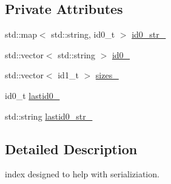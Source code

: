 \subsection*{Private Attributes}
\begin{DoxyCompactItemize}
\item 
std\-::map$<$ std\-::string, id0\-\_\-t $>$ \hyperlink{classfile__index_a6534d221b04ca8a8cdb12b05b87dd97b}{id0\-\_\-str\-\_\-}
\item 
std\-::vector$<$ std\-::string $>$ \hyperlink{classfile__index_a4be855352027b35e822cecf1f92a60a0}{id0\-\_\-}
\item 
std\-::vector$<$ id1\-\_\-t $>$ \hyperlink{classfile__index_a9be03afd832c7b341c13736733495c79}{sizes\-\_\-}
\item 
id0\-\_\-t \hyperlink{classfile__index_a710a18c15667280a8681bfb12cf20958}{lastid0\-\_\-}
\item 
std\-::string \hyperlink{classfile__index_aab103d49790f5d133985366205dbea47}{lastid0\-\_\-str\-\_\-}
\end{DoxyCompactItemize}


\subsection{Detailed Description}
index designed to help with serializiation. 

